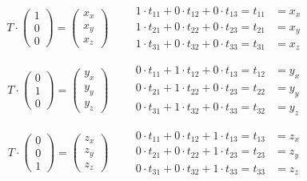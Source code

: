 \begin{equation}
 T \cdot \begin{pmatrix} 1 \\ 0 \\ 0 \end{pmatrix} = \begin{pmatrix} x_x \\ x_y \\ x_z \end{pmatrix} \qquad 
\begin{aligned}
 1 \cdot t_{11} + 0 \cdot t_{12} + 0 \cdot t_{13} = t_{11} &= x_x \\
 1 \cdot t_{21} + 0 \cdot t_{22} + 0 \cdot t_{23} = t_{21} &= x_y \\
 1 \cdot t_{31} + 0 \cdot t_{32} + 0 \cdot t_{33} = t_{31} &= x_z
\end{aligned}
\end{equation}

\begin{equation}
 T \cdot \begin{pmatrix} 0 \\ 1 \\ 0 \end{pmatrix} = \begin{pmatrix} y_x \\ y_y \\ y_z \end{pmatrix} \qquad
\begin{aligned}
 0 \cdot t_{11} + 1 \cdot t_{12} + 0 \cdot t_{13} = t_{12} &= y_x \\
 0 \cdot t_{21} + 1 \cdot t_{22} + 0 \cdot t_{23} = t_{22} &= y_y \\
 0 \cdot t_{31} + 1 \cdot t_{32} + 0 \cdot t_{33} = t_{32} &= y_z
\end{aligned}
\end{equation}

\begin{equation}
 T \cdot \begin{pmatrix} 0 \\ 0 \\ 1 \end{pmatrix} = \begin{pmatrix} z_x \\ z_y \\ z_z \end{pmatrix} \qquad
\begin{aligned}
 0 \cdot t_{11} + 0 \cdot t_{12} + 1 \cdot t_{13} = t_{13} &= z_x \\
 0 \cdot t_{21} + 0 \cdot t_{22} + 1 \cdot t_{23} = t_{23} &= z_y \\
 0 \cdot t_{31} + 0 \cdot t_{32} + 1 \cdot t_{33} = t_{33} &= z_z
\end{aligned}
\end{equation}

